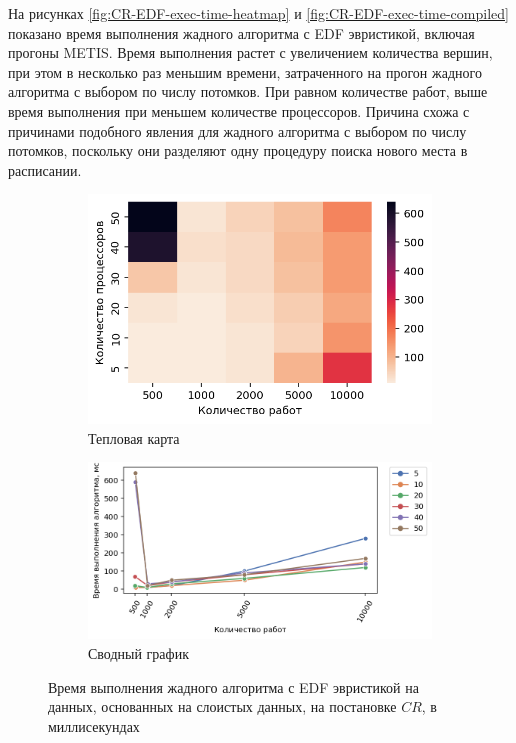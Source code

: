 На рисунках \ref{fig:CR-EDF-exec-time-heatmap} и \ref{fig:CR-EDF-exec-time-compiled} показано время выполнения жадного алгоритма с EDF эвристикой, включая прогоны METIS. Время выполнения растет с увеличением количества вершин, при этом в несколько раз меньшим времени, затраченного на прогон жадного алгоритма с выбором по числу потомков. При равном количестве работ, выше время выполнения при меньшем количестве процессоров. Причина схожа с причинами подобного явления для жадного алгоритма с выбором по числу потомков, поскольку они разделяют одну процедуру поиска нового места в расписании. 

\begin{figure}[!htbp]
    \centering
    \begin{subfigure}{0.49\textwidth}
        \includegraphics[width=\textwidth]{imgs/layered_class_1/CR_EDF/et_heatmap.png}
        \caption{Тепловая карта}
        \label{fig:CR-layered-EDF-exec-time-heatmap}
    \end{subfigure}
    \hfill
    \begin{subfigure}{0.49\textwidth}
        \includegraphics[width=\textwidth]{imgs/layered_class_1/CR_EDF/tr_graph.png}
        \caption{Сводный график}
        \label{fig:CR-layered-EDF-exec-time-compiled}
    \end{subfigure}
    \caption{Время выполнения жадного алгоритма с EDF эвристикой на данных, основанных на слоистых данных, на постановке $CR$, в миллисекундах}
\end{figure}

